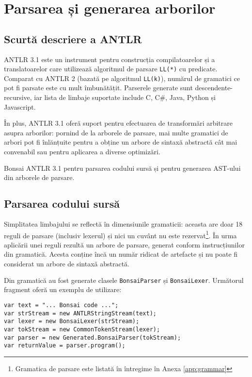 \documentclass[12pt,a4paper]{memoir}
\begin{document}
\chapter{Parsarea și generarea arborilor}

\section{Scurtă descriere a ANTLR}

ANTLR 3.1\cite{antlr} este un instrument pentru construcția compilatoarelor și a translatoarelor care utilizează algoritmul de parsare \texttt{LL(*)} cu predicate\cite{definitive_antlr_reference}. Comparat cu ANTLR 2 (bazată pe algoritmul \texttt{LL(k)}), numărul de gramatici ce pot fi parsate este cu mult îmbunătățit. Parserele generate sunt descendente-recursive, iar lista de limbaje suportate\cite{antlr_targets} include C, C\#, Java, Python și Javascript.

În plus, ANTLR 3.1 oferă suport pentru efectuarea de transformări arbitrare asupra arborilor: pornind de la arborele de parsare, mai multe gramatici de arbori pot fi înlănțuite pentru a obține un arbore de sintaxă abstractă cât mai convenabil sau pentru aplicarea a diverse optimizări\cite{antlr_tree_grammars}.

Bonsai ANTLR 3.1 pentru parsarea codului sursă și pentru generarea AST-ului din arborele de parsare. 

\section{Parsarea codului sursă}

Simplitatea limbajului se reflectă în dimensiunile gramaticii: aceasta are doar 18 reguli de parsare (inclusiv lexerul) și nici un cuvânt nu este rezervat\footnote{Gramatica de parsare este listată în întregime în Anexa \ref{app:grammar}}. În urma aplicării unei reguli rezultă un arbore de parsare, generat conform instrucțiunilor din gramatică. Acesta conține încă un număr ridicat de artefacte și nu poate fi considerat un arbore de sintaxă abstractă.

Din gramatică au fost generate clasele \texttt{BonsaiParser} și \texttt{BonsaiLexer}. Următorul fragment oferă un exemplu de utilizare:

\begin{Verbatim}
var text = "... Bonsai code ...";
var strStream = new ANTLRStringStream(text);
var lexer = new BonsaiLexer(strStream);
var tokStream = new CommonTokenStream(lexer);
var parser = new Generated.BonsaiParser(tokStream);
var returnValue = parser.program();
\end{Verbatim}
\end{document}
